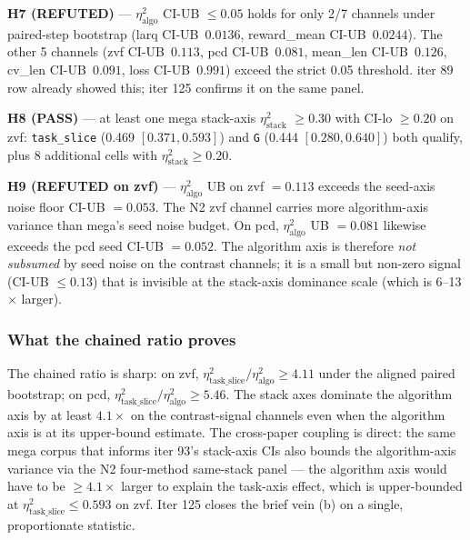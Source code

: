 \textbf{H7 (REFUTED)} --- $\eta^2_{\mathrm{algo}}$ CI-UB $\leq 0.05$ holds for
only 2/7 channels under paired-step bootstrap (larq CI-UB~$0.0136$,
reward\_mean CI-UB~$0.0244$). The other 5 channels (zvf CI-UB~$0.113$,
pcd CI-UB~$0.081$, mean\_len CI-UB~$0.126$, cv\_len CI-UB~$0.091$,
loss CI-UB~$0.991$) exceed the strict 0.05 threshold. iter 89 row
already showed this; iter 125 confirms it on the same panel.

\textbf{H8 (PASS)} --- at least one mega stack-axis $\eta^2_{\mathrm{stack}}$
$\geq 0.30$ with CI-lo $\geq 0.20$ on zvf: \texttt{task\_slice} (0.469
$[0.371, 0.593]$) and \texttt{G} (0.444 $[0.280, 0.640]$) both qualify,
plus 8 additional cells with $\eta^2_{\mathrm{stack}} \geq 0.20$.

\textbf{H9 (REFUTED on zvf)} --- $\eta^2_{\mathrm{algo}}$ UB on zvf
$= 0.113$ exceeds the seed-axis noise floor CI-UB
$= 0.053$. The N2 zvf channel carries more algorithm-axis variance
than mega's seed noise budget. On pcd, $\eta^2_{\mathrm{algo}}$ UB
$= 0.081$ likewise exceeds the pcd seed CI-UB $= 0.052$. The
algorithm axis is therefore \emph{not subsumed} by seed noise on the
contrast channels; it is a small but non-zero signal (CI-UB $\leq 0.13$)
that is invisible at the stack-axis dominance scale (which is 6--13$\times$
larger).

\subsubsection{What the chained ratio proves}
\label{sec:p5-iter125-what}
The chained ratio is sharp: on zvf, $\eta^2_{\mathrm{task\_slice}} /
\eta^2_{\mathrm{algo}} \geq 4.11$ under the aligned paired bootstrap;
on pcd, $\eta^2_{\mathrm{task\_slice}} / \eta^2_{\mathrm{algo}} \geq 5.46$.
The stack axes dominate the algorithm axis by at least $4.1\times$ on
the contrast-signal channels even when the algorithm axis is at its
upper-bound estimate. The cross-paper coupling is direct: the same
mega corpus that informs iter 93's stack-axis CIs also bounds the
algorithm-axis variance via the N2 four-method same-stack panel ---
the algorithm axis would have to be $\geq 4.1 \times$ larger to
explain the task-axis effect, which is upper-bounded at $\eta^2_{\mathrm{task\_slice}}
\leq 0.593$ on zvf. Iter 125 closes the brief vein (b) on a single,
proportionate statistic.

